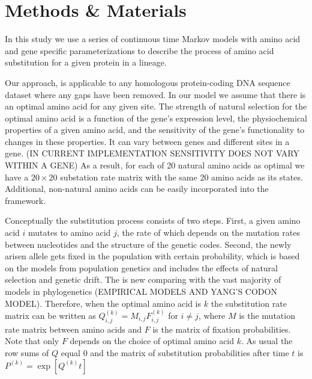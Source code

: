 \section{Methods \& Materials}
In this study we use a series of continuous time Markov models with amino acid and gene specific parameterizations to describe the process of amino acid substitution for a given protein in a lineage. 

Our approach, is applicable to any homologous protein-coding DNA sequence dataset where any gaps have been removed.
In our model we assume that there is an optimal amino acid for any given site.
The strength of natural selection for the optimal amino acid is a function of the gene's expression level, the physiochemical properties of a given amino acid, and the sensitivity of the gene's functionality to changes in these properties.
It can vary between genes and different sites in a gene. (IN CURRENT IMPLEMENTATION SENSITIVITY DOES NOT VARY WITHIN A GENE)
As a result, for each of 20 natural amino acids as optimal we have a $20 \times 20$ substation rate matrix with the same 20 amino acids as its states. 
Additional, non-natural amino acids can be easily incorporated into the framework.


Conceptually the substitution process consists of two steps. 
First, a given amino acid $i$ mutates to amino acid $j$, the rate of which depends on the mutation rates between nucleotides and the structure of the genetic codes. 
Second, the newly arisen allele gets fixed in the population with certain probability, which is based on the models from population genetics and includes the effects of natural selection and genetic drift. 
The is new comparing with the vast majority of models in phylogenetics (EMPIRICAL MODELS AND YANG'S CODON MODEL).
Therefore, when the optimal amino acid is $k$ the substitution rate matrix can be written as $Q_{i,j}^{(k)}=M_{i,j}F_{i,j}^{(k)}$ for $i \ne j$, where $M$ is the mutation rate matrix between amino acids and $F$ is the matrix of fixation probabilities. 
Note that only $F$ depends on the choice of optimal amino acid $k$. 
As usual the row sums of $Q$ equal $0$ and the matrix of substitution probabilities after time $t$ is $P^{(k)} = \exp [Q^{(k)}t]$

